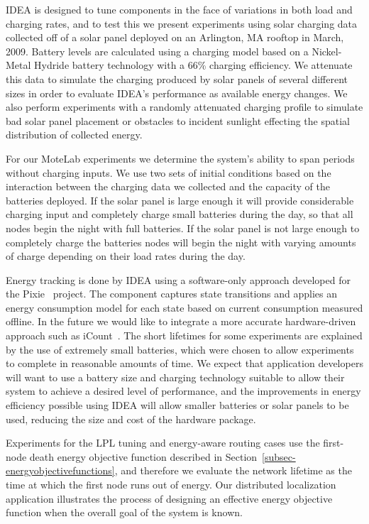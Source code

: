 \documentclass{sig-alternate}
\begin{document}
IDEA is designed to tune components in the face of variations in both load
and charging rates, and to test this we present experiments using solar
charging data collected off of a solar panel deployed on an Arlington, MA
rooftop in March, 2009. Battery levels are calculated using a charging model
based on a Nickel-Metal Hydride battery technology with a 66\% charging
efficiency. We attenuate this data to simulate the charging produced by solar
panels of several different sizes in order to evaluate IDEA's performance as
available energy changes. We also perform experiments with a randomly
attenuated charging profile to simulate bad solar panel placement or
obstacles to incident sunlight effecting the spatial distribution of
collected energy.

For our MoteLab experiments we determine the system's ability to span periods
without charging inputs. We use two sets of initial conditions based on the
interaction between the charging data we collected and the capacity of the
batteries deployed. If the solar panel is large enough it will provide
considerable charging input and completely charge small batteries during the
day, so that all nodes begin the night with full batteries. If the solar
panel is not large enough to completely charge the batteries nodes will begin
the night with varying amounts of charge depending on their load rates during
the day.

Energy tracking is done by IDEA using a software-only approach developed for
the Pixie~\cite{pixie-sensys08} project. The component captures state
transitions and applies an energy consumption model for each state based on
current consumption measured offline. In the future we would like to
integrate a more accurate hardware-driven approach such as
iCount~\cite{icount-spots08}. The short lifetimes for some experiments are
explained by the use of extremely small batteries, which were chosen to allow
experiments to complete in reasonable amounts of time. We expect that
application developers will want to use a battery size and charging
technology suitable to allow their system to achieve a desired level of
performance, and the improvements in energy efficiency possible using IDEA
will allow smaller batteries or solar panels to be used, reducing the size
and cost of the hardware package.

Experiments for the LPL tuning and energy-aware routing cases use the
first-node death energy objective function described in
Section~\ref{subsec-energyobjectivefunctions}, and therefore we evaluate the
network lifetime as the time at which the first node runs out of energy. Our
distributed localization application illustrates the process of designing an
effective energy objective function when the overall goal of the system is
known.
\end{document}
